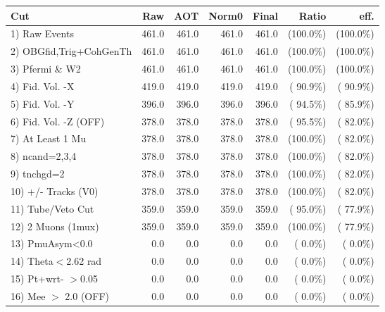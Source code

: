  \begin{table}[h!]\centering
 \begin{tabular}{||l||r|r|r|r|r|r||}
 \hline
 \hline
 Cut & Raw & AOT & Norm0 & Final & Ratio & eff.       \\
 \hline
  1) Raw Events           &        461.0 &        461.0 &        461.0 &        461.0 & (100.0\%) & (100.0\%) \\
  2) OBGfid,Trig+CohGenTh &        461.0 &        461.0 &        461.0 &        461.0 & (100.0\%) & (100.0\%) \\
  3) Pfermi \& W2         &        461.0 &        461.0 &        461.0 &        461.0 & (100.0\%) & (100.0\%) \\
  4) Fid. Vol. -X         &        419.0 &        419.0 &        419.0 &        419.0 & ( 90.9\%) & ( 90.9\%) \\
  5) Fid. Vol. -Y         &        396.0 &        396.0 &        396.0 &        396.0 & ( 94.5\%) & ( 85.9\%) \\
  6) Fid. Vol. -Z (OFF)   &        378.0 &        378.0 &        378.0 &        378.0 & ( 95.5\%) & ( 82.0\%) \\
  7) At Least 1 Mu        &        378.0 &        378.0 &        378.0 &        378.0 & (100.0\%) & ( 82.0\%) \\
  8) ncand=2,3,4          &        378.0 &        378.0 &        378.0 &        378.0 & (100.0\%) & ( 82.0\%) \\
  9) tnchgd=2             &        378.0 &        378.0 &        378.0 &        378.0 & (100.0\%) & ( 82.0\%) \\
 10) +/- Tracks (V0)      &        378.0 &        378.0 &        378.0 &        378.0 & (100.0\%) & ( 82.0\%) \\
 11) Tube/Veto Cut        &        359.0 &        359.0 &        359.0 &        359.0 & ( 95.0\%) & ( 77.9\%) \\
 12) 2 Muons (1mux)       &        359.0 &        359.0 &        359.0 &        359.0 & (100.0\%) & ( 77.9\%) \\
 13) PmuAsym<0.0          &          0.0 &          0.0 &          0.0 &          0.0 & (  0.0\%) & (  0.0\%) \\
 14) Theta$<$2.62 rad     &          0.0 &          0.0 &          0.0 &          0.0 & (  0.0\%) & (  0.0\%) \\
 15) Pt+wrt- $>$0.05      &          0.0 &          0.0 &          0.0 &          0.0 & (  0.0\%) & (  0.0\%) \\
 16) Mee $>$ 2.0  (OFF)   &          0.0 &          0.0 &          0.0 &          0.0 & (  0.0\%) & (  0.0\%) \\

\end{tabular}
\end{table}
